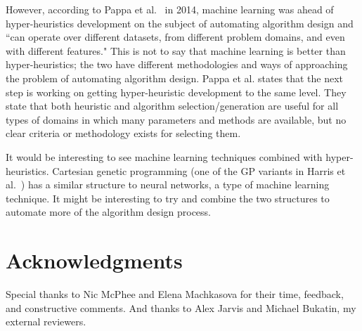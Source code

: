 \documentclass{sig-alternate}
\begin{document}
However, according to Pappa et al.~\cite{pappa:2014} in 2014, machine learning was ahead of hyper-heuristics development on the subject of automating algorithm design and ``can operate over different datasets, from different problem domains, and even with different features." This is not to say that machine learning is better than hyper-heuristics; the two have different methodologies and ways of approaching the problem of automating algorithm design. Pappa et al. states that the next step is working on getting hyper-heuristic development to the same level. They state that both heuristic and algorithm selection/generation are useful for all types of domains in which many parameters and methods are available, but no clear criteria or methodology exists for selecting them.

It would be interesting to see machine learning techniques combined with hyper-heuristics. Cartesian genetic programming (one of the GP variants in Harris et al.~\cite{harris:2015}) has a similar structure to neural networks, a type of machine learning technique. It might be interesting to try and combine the two structures to automate more of the algorithm design process.

\section*{Acknowledgments}
\label{sec:acknowledgments}
Special thanks to Nic McPhee and Elena Machkasova for their time, feedback, and constructive comments. And thanks to Alex Jarvis and Michael Bukatin, my external reviewers.



  
\end{document}
